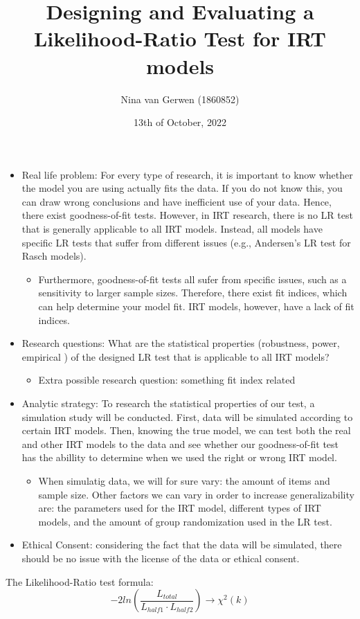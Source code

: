 \documentclass{article}
\title{Designing and Evaluating a Likelihood-Ratio Test for IRT models}
\author{Nina van Gerwen (1860852)}
\date{13th of October, 2022}
\begin{document}
\maketitle

\newpage
\begin{itemize}
\item Real life problem: For every type of research, it is important to know whether the model you are using actually fits the data. If you do not know this, you can draw wrong conclusions and have inefficient use of your data. Hence, there exist goodness-of-fit tests. However, in IRT research, there is no LR test that is generally applicable to all IRT models. Instead, all models have specific LR tests that suffer from different issues (e.g., Andersen's LR test for Rasch models).
	\begin{itemize}
		\item Furthermore, goodness-of-fit tests all sufer from specific issues, such as a sensitivity to larger sample sizes. Therefore, there exist fit indices, which can help determine your model fit. IRT models, however, have a lack of fit indices.
	\end{itemize}
\item Research questions: What are the statistical properties (robustness, power, empirical \alpha) of the designed LR test that is applicable to all IRT models?
	\begin{itemize} 
		\item Extra possible research question: something fit index related
	\end{itemize}
\item Analytic strategy: To research the statistical properties of our test, a simulation study will be conducted. First, data will be simulated according to certain IRT models. Then, knowing the true model, we can test both the real and other IRT models to the data and see whether our goodness-of-fit test has the abillity to determine when we used the right or wrong IRT model. 
	\begin{itemize}
		\item When simulatig data, we will for sure vary: the amount of items and sample size. Other factors we can vary in order to increase generalizability are: the parameters used for the IRT model, different types of IRT models, and the amount of group randomization used in the LR test.
	\end{itemize}
\item Ethical Consent: considering the fact that the data will be simulated, there should be no issue with the license of the data or ethical consent.
\end{itemize}

The Likelihood-Ratio test formula:
\begin{equation}
- 2ln (\frac{L_{total}}{L_{half1}\cdot L_{half2}}) \rightarrow \chi^{2}(k)
\end{equation}
\end{document}
